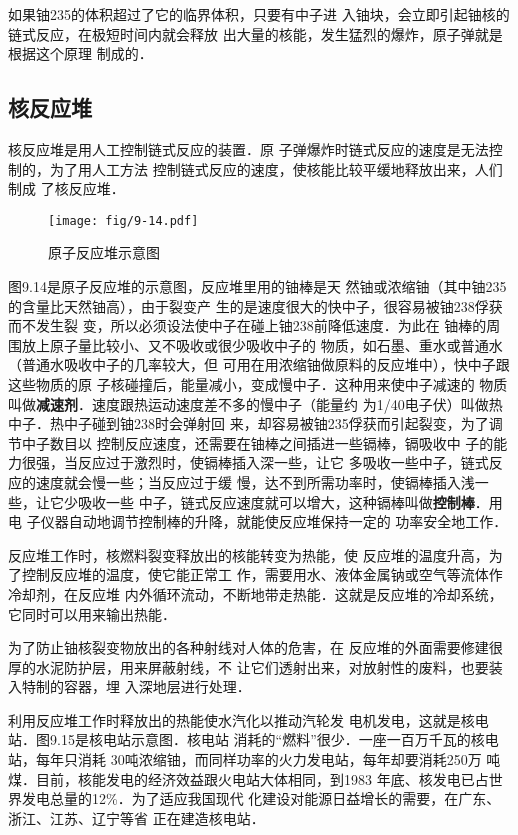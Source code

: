 如果铀235的体积超过了它的临界体积，只要有中子进
入铀块，会立即引起铀核的链式反应，在极短时间内就会释放
出大量的核能，发生猛烈的爆炸，原子弹就是根据这个原理
制成的．

\subsection{核反应堆}

核反应堆是用人工控制链式反应的装置．原
子弹爆炸时链式反应的速度是无法控制的，为了用人工方法
控制链式反应的速度，使核能比较平缓地释放出来，人们制成
了核反应堆．
\begin{figure}[htp]
    \centering
    \texttt{[image: fig/9-14.pdf]}
    \caption{原子反应堆示意图}
\end{figure}

图9.14是原子反应堆的示意图，反应堆里用的铀棒是天
然铀或浓缩铀（其中铀235的含量比天然铀高），由于裂变产
生的是速度很大的快中子，很容易被铀238俘获而不发生裂
变，所以必须设法使中子在碰上铀238前降低速度．为此在
铀棒的周围放上原子量比较小、又不吸收或很少吸收中子的
物质，如石墨、重水或普通水（普通水吸收中子的几率较大，但
可用在用浓缩铀做原料的反应堆中），快中子跟这些物质的原
子核碰撞后，能量减小，变成慢中子．这种用来使中子减速的
物质叫做\textbf{减速剂}．速度跟热运动速度差不多的慢中子（能量约
为1/40电子伏）叫做热中子．热中子碰到铀238时会弹射回
来，却容易被铀235俘获而引起裂变，为了调节中子数目以
控制反应速度，还需要在铀棒之间插进一些镉棒，镉吸收中
子的能力很强，当反应过于激烈时，使镉棒插入深一些，让它
多吸收一些中子，链式反应的速度就会慢一些；当反应过于缓
慢，达不到所需功率时，使镉棒插入浅一些，让它少吸收一些
中子，链式反应速度就可以增大，这种镉棒叫做\textbf{控制棒}．用电
子仪器自动地调节控制棒的升降，就能使反应堆保持一定的
功率安全地工作．

反应堆工作时，核燃料裂变释放出的核能转变为热能，使
反应堆的温度升高，为了控制反应堆的温度，使它能正常工
作，需要用水、液体金属钠或空气等流体作冷却剂，在反应堆
内外循环流动，不断地带走热能．这就是反应堆的冷却系统，
它同时可以用来输出热能．

为了防止铀核裂变物放出的各种射线对人体的危害，在
反应堆的外面需要修建很厚的水泥防护层，用来屏蔽射线，不
让它们透射出来，对放射性的废料，也要装入特制的容器，埋
入深地层进行处理．

利用反应堆工作时释放出的热能使水汽化以推动汽轮发
电机发电，这就是核电站．图9.15是核电站示意图．核电站
消耗的“燃料”很少．一座一百万千瓦的核电站，每年只消耗
30吨浓缩铀，而同样功率的火力发电站，每年却要消耗250万
吨煤．目前，核能发电的经济效益跟火电站大体相同，到1983
年底、核发电已占世界发电总量的12\%．为了适应我国现代
化建设对能源日益增长的需要，在广东、浙江、江苏、辽宁等省
正在建造核电站．

